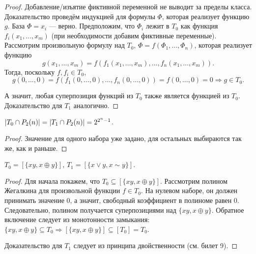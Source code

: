 \begin{proof}
    Добавление/изъятие фиктивной переменной не выводит за пределы класса.\\ 
    Доказательство проведём индукцией для формулы $\Phi$, которая реализует функцию $g$. База $\Phi = x_i$ --- верно. Предположим, что $\Phi_i$ лежит в $T_0$ как функция $f_i(x_1,\ldots,x_m)$ (при необходимости добавим фиктивные переменные). Рассмотрим произвольную формулу над $T_0$, $\Phi = f(\Phi_1, \ldots, \Phi_n)$, которая реализует функцию
    \[
        g(x_1,\ldots, x_m) = f(f_1(x_1, \ldots, x_m), \ldots, f_n(x_1, \ldots, x_m)).
    \]
    Тогда, поскольку $f, f_i \in T_0$,
    \[
        g(0,\ldots, 0) = f(f_1(0, \ldots, 0), \ldots, f_n(0, \ldots, 0)) = f(0, \ldots, 0) = 0 \Rightarrow g \in T_0.
    \]
    
    А значит, любая суперпозиция функций из $T_0$ также является функцией из $T_0$. Доказательство для $T_1$ аналогично.
\end{proof}

\begin{proposal}
    $\left\lvert T_0 \cap P_2(n)\right\rvert = \left\lvert T_1 \cap P_2(n)\right\rvert = 2^{2^n - 1}$.
\end{proposal}

\begin{proof}
    Значение для одного набора уже задано, для остальных выбираются так же, как и раньше.
\end{proof}

\begin{proposal}
    $T_0 = [\{xy, x\oplus y\}]$, $T_1 = [\{x\vee y, x\sim y\}]$.
\end{proposal}

\begin{proof}
    Для начала покажем, что $T_0 \subseteq [\{xy, x\oplus y\}]$. Рассмотрим полином Жегалкина для произвольной функции $f \in T_0$. На нулевом наборе, он должен принимать значение 0, а значит, свободный коэффициент в полиноме равен 0. Следовательно, полином получается суперпозициями над $\{xy, x\oplus y\}$. Обратное включение следует из монотонности замыкания: $\{xy, x\oplus y\}\subseteq T_0 \Rightarrow [\{xy, x\oplus y\}] \subseteq [T_0] = T_0$.

    Доказательство для $T_1$ следует из принципа двойственности (см. билет 9).
\end{proof}